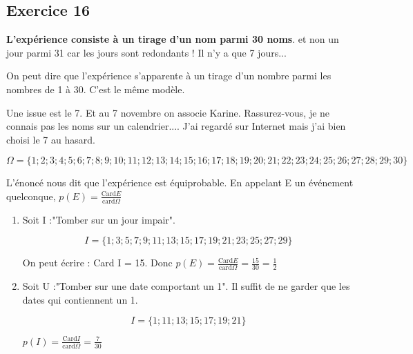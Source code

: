 \documentclass[openany]{book}
\begin{document}
\begin{minipage}{0.5\linewidth}
 
 
\subsection{Exercice 16}
 
\textbf{L'expérience consiste à un tirage d'un nom parmi 30 noms}. et non un jour parmi 31 car les jours sont redondants ! Il n'y a que 7 jours...

On peut dire que l'expérience s'apparente à un tirage d'un nombre parmi les nombres de 1 à 30. C'est le même modèle.

Une issue est le 7. Et au 7 novembre on associe Karine. Rassurez-vous, je ne connais pas les noms sur un calendrier.... J'ai regardé sur Internet mais j'ai bien choisi le 7 au hasard.

$$\Omega = \lbrace 1;2;3;4;5;6;7;8;9;10;11;12;13;14;15;16;17;18;19;20;21;22;23;24;25;26;27;28;29;30\rbrace$$
 
L'énoncé nous dit que l'expérience est équiprobable. En appelant E un événement quelconque, $p(E)= \frac{\text{Card} E}{\text{card}\Omega}$
 
\begin{enumerate}
\item Soit I :"Tomber sur un jour impair".
 
 $$I = \lbrace 1;3;5;7;9;11;13;15;17;19;21;23;25;27;29\rbrace$$
 
On peut écrire : Card I = 15. Donc $p(E)= \frac{\text{Card} E}{\text{card}\Omega}= \frac{15}{30}= \frac{1}{2}$
 
\item Soit U :"Tomber sur une date comportant un 1". Il suffit de ne garder que les dates qui contiennent un 1.

$$I = \lbrace 1;11;13;15;17;19;21\rbrace$$
 
  $p(I)= \frac{\text{Card} I}{\text{card}\Omega}= \frac{7}{30}$
 
  
\end{enumerate} 
 
\end{minipage}



\newpage
\end{document}
